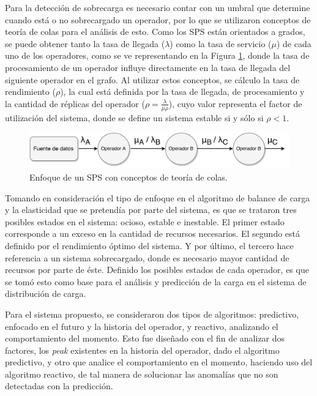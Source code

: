 Para la detección de sobrecarga es necesario contar con un umbral que determine cuando está o no sobrecargado un operador, por lo que se utilizaron conceptos de teoría de colas \citep{bose2013introduction} para el análisis de esto. Como los SPS están orientados a grados, se puede obtener tanto la tasa de llegada ($\lambda$) como la tasa de servicio ($\mu$) de cada uno de los operadores, como se ve representando en la Figura \ref{fig:analisisTeoriaColas}, donde la tasa de procesamiento de un operador influye directamente en la tasa de llegada del siguiente operador en el grafo. Al utilizar estos conceptos, se cálculo la tasa de rendimiento ($\rho$), la cual está definida por la tasa de llegada, de procesamiento y la cantidad de réplicas del operador ($\rho = \frac{\lambda}{\mu \rho}$), cuyo valor representa el factor de utilización del sistema, donde se define un sistema estable si y sólo si $\rho < 1$.

\begin{figure}[!hb]
	\centering
		\includegraphics[scale=0.6]{images/AnalisisTeoriaColas.pdf}
	\caption{Enfoque de un SPS con conceptos de teoría de colas.}
	\label{fig:analisisTeoriaColas}
\end{figure}

Tomando en consideración el tipo de enfoque en el algoritmo de balance de carga y la elasticidad que se pretendía por parte del sistema, es que se trataron tres posibles estados en el sistema: ocioso, estable e inestable. El primer estado corresponde a un exceso en la cantidad de recursos necesarios. El segundo está definido por el rendimiento óptimo del sistema. Y por último, el tercero hace referencia a un sistema sobrecargado, donde es necesario mayor cantidad de recursos por parte de éste. Definido los posibles estados de cada operador, es que se tomó esto como base para el análisis y predicción de la carga en el sistema de distribución de carga.

Para el sistema propuesto, se consideraron dos tipos de algoritmos: predictivo, enfocado en el futuro y la historia del operador, y reactivo, analizando el comportamiento del momento. Esto fue diseñado con el fin de analizar dos factores, los \textit{peak} existentes en la historia del operador, dado el algoritmo predictivo, y otro que analice el comportamiento en el momento, haciendo uso del algoritmo reactivo, de tal manera de solucionar las anomalías que no son detectadas con la predicción.

